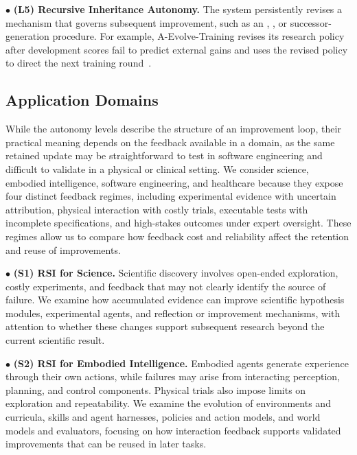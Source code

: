 \noindent$\bullet$ \textbf{(L5) Recursive Inheritance Autonomy.} The system persistently revises a mechanism that governs subsequent improvement, such as an \Improver, \Verifier, or successor-generation procedure. For example, A-Evolve-Training revises its research policy after development scores fail to predict external gains and uses the revised policy to direct the next training round~\cite{shi2026aevolvetraining}.



\subsection{Application Domains}

While the autonomy levels describe the structure of an improvement loop, their practical meaning depends on the feedback available in a domain, as the same retained update may be straightforward to test in software engineering and difficult to validate in a physical or clinical setting. We consider science, embodied intelligence, software engineering, and healthcare because they expose four distinct feedback regimes, including experimental evidence with uncertain attribution, physical interaction with costly trials, executable tests with incomplete specifications, and high-stakes outcomes under expert oversight. These regimes allow us to compare how feedback cost and reliability affect the retention and reuse of improvements.

\noindent$\bullet$ \textbf{(S1) RSI for Science.}
Scientific discovery involves open-ended exploration, costly experiments, and feedback that may not clearly identify the source of failure. We examine how accumulated evidence can improve scientific hypothesis modules, experimental agents, and reflection or improvement mechanisms, with attention to whether these changes support subsequent research beyond the current scientific result.

\noindent$\bullet$ \textbf{(S2) RSI for Embodied Intelligence.}
Embodied agents generate experience through their own actions, while failures may arise from interacting perception, planning, and control components. Physical trials also impose limits on exploration and repeatability. We examine the evolution of environments and curricula, skills and agent harnesses, policies and action models, and world models and evaluators, focusing on how interaction feedback supports validated improvements that can be reused in later tasks.

